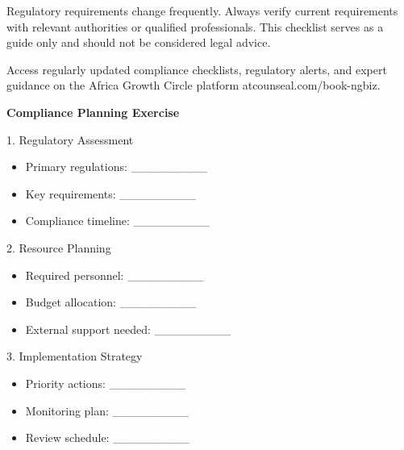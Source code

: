 \vspace{2em}

\begin{warningbox}
    Regulatory requirements change frequently. Always verify current requirements with relevant authorities or qualified professionals. This checklist serves as a guide only and should not be considered legal advice.
\end{warningbox}

\vspace{1em}

\begin{communitybox}
    Access regularly updated compliance checklists, regulatory alerts, and expert guidance on the Africa Growth Circle platform atcounseal.com/book-ngbiz.
\end{communitybox}

\vspace{1em}

\begin{workshopbox}
    \textbf{Compliance Planning Exercise}

    1. Regulatory Assessment
    \begin{itemize}[leftmargin=*]
        \item Primary regulations: \_\_\_\_\_\_\_\_\_
        \item Key requirements: \_\_\_\_\_\_\_\_\_
        \item Compliance timeline: \_\_\_\_\_\_\_\_\_
    \end{itemize}

    2. Resource Planning
    \begin{itemize}[leftmargin=*]
        \item Required personnel: \_\_\_\_\_\_\_\_\_
        \item Budget allocation: \_\_\_\_\_\_\_\_\_
        \item External support needed: \_\_\_\_\_\_\_\_\_
    \end{itemize}

    3. Implementation Strategy
    \begin{itemize}[leftmargin=*]
        \item Priority actions: \_\_\_\_\_\_\_\_\_
        \item Monitoring plan: \_\_\_\_\_\_\_\_\_
        \item Review schedule: \_\_\_\_\_\_\_\_\_
    \end{itemize}
\end{workshopbox}

